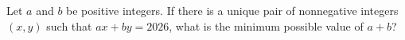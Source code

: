 Let $a$ and $b$ be positive integers. If there is a unique pair of nonnegative integers $(x,y)$ such that $ax+by=2026$, what is the minimum possible value of $a+b$?

